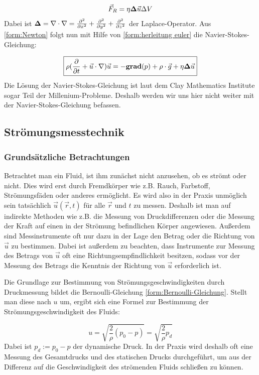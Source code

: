 \begin{equation}
\vec{F}_R = \eta {\bf \Delta} \vec{u} \Delta V
\end{equation}
Dabei ist $ {\bf \Delta} = \nabla \cdot \nabla = \frac{\partial^2}{\partial x^2} + \frac{\partial^2}{\partial y^2} + \frac{\partial^2}{\partial z^2} $ der Laplace-Operator. Aus \ref{form:Newton} folgt nun mit Hilfe von \ref{form:herleitung euler} die Navier-Stokes-Gleichung:

\begin{equation}
\boxed{\rho (\frac{\partial}{\partial t} + \vec{u} \cdot \nabla ) \vec{u} = - {\bf grad}(p) + \rho \cdot \vec{g} + \eta {\bf \Delta} \vec{u}}
\end{equation}
Die Lösung der Navier-Stokes-Gleichung ist laut dem Clay Mathematics Institute sogar Teil der Millenium-Probleme. Deshalb werden wir uns hier nicht weiter mit der Navier-Stokes-Gleichung befassen.

\subsection{Strömungsmesstechnik}
\subsubsection{Grundsätzliche Betrachtungen}
Betrachtet man ein Fluid, ist ihm zunächst nicht anzusehen, ob es strömt oder nicht. Dies wird erst durch Fremdkörper wie z.B. Rauch, Farbstoff, Strömungsfäden oder anderes ermöglicht. Es wird also in der Praxis unmöglich sein tatsächlich $ \vec{u} ( \vec{r} , t) $ für alle $ \vec{r} $ und $t$ zu messen. Deshalb ist man auf indirekte Methoden wie z.B. die  Messung von Druckdifferenzen oder die Messung der Kraft auf einen in der Strömung befindlichen Körper angewiesen. Außerdem sind Messinstrumente oft nur dazu in der Lage den Betrag oder die Richtung von $ \vec{u} $ zu bestimmen. Dabei ist außerdem zu beachten, dass Instrumente zur Messung des Betrags von $ \vec{u} $ oft eine Richtungsempfindlichkeit besitzen, sodass vor der Messung des Betrags die Kenntnis der Richtung von $ \vec{u} $ erforderlich ist.

Die Grundlage zur Bestimmung von Strömungsgeschwindigkeiten durch Druckmessung bildet die Bernoulli-Gleichung \ref{form:Bernoulli-Gleichung}. Stellt man diese nach $u$ um, ergibt sich eine Formel zur Bestimmung der Strömungsgeschwindigkeit des Fluids:

\begin{equation}
\boxed{u = \sqrt{\frac{2}{\rho} (p_0 - p)} = \sqrt{\frac{2}{\rho} p_d}}
\label{eq:Geschwindigkeitsformel}
\end{equation} 
Dabei ist $ p_d := p_0 - p $ der dynamische Druck. In der Praxis wird deshalb oft eine Messung des Gesamtdrucks und des statischen Drucks durchgeführt, um aus der Differenz auf die Geschwindigkeit des strömenden Fluids schließen zu können.

